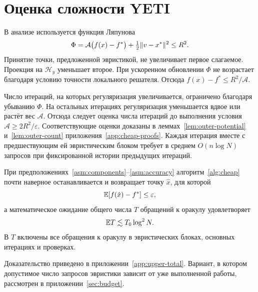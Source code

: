 \section{Оценка сложности YETI}\label{sec:cheap-analysis}
В анализе используется функция Ляпунова
\[
 \Phi=\mathcal A\bigl(f(x)-f^\ast\bigr)
       +\tfrac12\lVert v-x^\ast\rVert^2\le R^2.
\]
Принятие точки, предложенной эвристикой, не увеличивает первое слагаемое.
Проекция на $\mathcal H_y$ уменьшает второе. При ускоренном обновлении
$\Phi$ не возрастает благодаря условию точности локального решателя.
Отсюда $f(x)-f^\ast\le R^2/\mathcal A$.

Число итераций, на которых регуляризация увеличивается, ограничено
благодаря убыванию $\Phi$. На остальных итерациях регуляризация
уменьшается вдвое или растёт вес $\mathcal A$. Отсюда следует оценка
числа итераций до выполнения условия $\mathcal A\ge2R^2/\varepsilon$.
Соответствующие оценки доказаны в леммах~\ref{lem:outer-potential}
и~\ref{lem:outer-count} приложения~\ref{app:cheap-proofs}.
Каждая итерация вместе с предшествующим ей эвристическим блоком
требует в среднем $O(n\log N)$ запросов при фиксированной истории
предыдущих итераций.

\begin{theorem}\label{thm:cheap-upper}
При предположениях~\ref{asm:components}--\ref{asm:accuracy}
алгоритм~\ref{alg:cheap} почти наверное останавливается и возвращает
точку $\hat x$, для которой
\begin{equation}\label{eq:cheap-upper-final}
 \mathbb E[f(\hat x)-f^\ast]\le\varepsilon,
\end{equation}
а математическое ожидание общего числа $T$ обращений к оракулу
удовлетворяет
\begin{equation}\label{eq:cheap-upper-cost}
 \mathbb E T\lesssim T_0\log^2N.
\end{equation}
В $T$ включены все обращения к оракулу в эвристических блоках,
основных итерациях и проверках.
\end{theorem}

Доказательство приведено
в приложении~\ref{app:upper-total}. Вариант, в котором допустимое число запросов
эвристики зависит от уже выполненной работы, рассмотрен
в приложении~\ref{sec:budget}.
